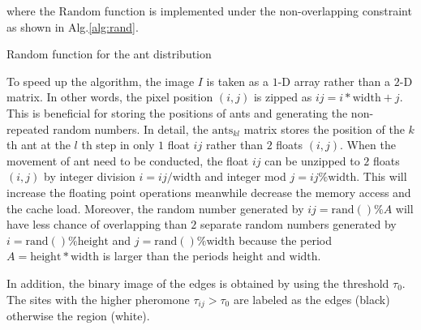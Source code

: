 \documentclass[letterpaper]{article}
\begin{document}
where the $\mathrm{Random}$ function is implemented under the non-overlapping constraint as shown in Alg.\ref{alg:rand}.
\begin{algorithm}
	\;
	\caption{Random function for the ant distribution}\label{alg:rand}
\end{algorithm}

To speed up the algorithm, the image $I$ is taken as a $1$-D array rather than a $2$-D matrix. In other words, the pixel position $(i,j)$ is zipped as $ij=i*\mathrm{width}+j$. This is beneficial for storing the positions of ants and generating the non-repeated random numbers. In detail, the $\mathrm{ants}_{kl}$ matrix stores the position of the $k$th ant at the $l$ th step in only $1$ float $ij$ rather than $2$ floats $(i,j)$. When the movement of ant need to be conducted, the float $ij$ can be unzipped to $2$ floats $(i,j)$ by integer division $i=ij/\mathrm{width}$ and integer mod $j=ij\%\mathrm{width}$. This will increase the floating point operations meanwhile decrease the memory access and the cache load. Moreover, the random number generated by $ij=\mathrm{rand}()\%A$ will have less chance of overlapping than $2$ separate random numbers generated by $i=\mathrm{rand}()\%\mathrm{height}$ and $j=\mathrm{rand}()\%\mathrm{width}$ because the period $A=\mathrm{height}*\mathrm{width}$ is larger than the periods $\mathrm{height}$ and $\mathrm{width}$.      

In addition, the binary image of the edges is obtained by using the threshold $\tau_{0}$. The sites with the higher pheromone $\tau_{ij}>\tau_0$ are labeled as the edges (black) otherwise the region (white).
\end{document}
